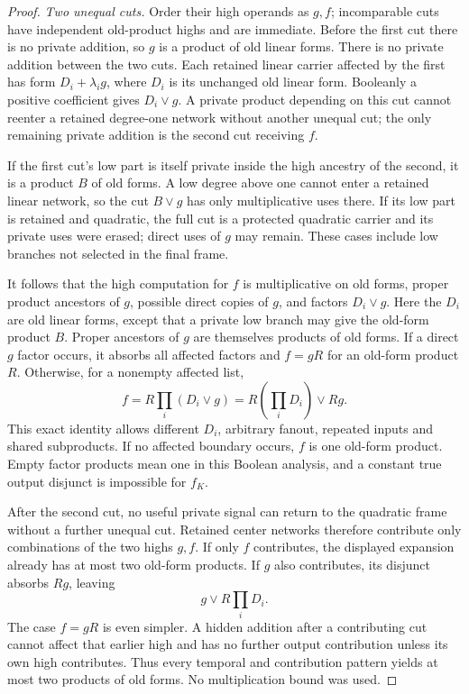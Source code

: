 \documentclass[11pt]{article}
\theoremstyle{definition}
\theoremstyle{remark}
\begin{document}
\begin{proof}
\emph{Two unequal cuts.}
Order their high operands as $g,f$; incomparable cuts have independent old-product highs and are immediate. Before the first cut there is no private addition, so $g$ is a product of old linear forms. There is no private addition between the two cuts. Each retained linear carrier affected by the first has form $D_i+\lambda_i g$, where $D_i$ is its unchanged old linear form. Booleanly a positive coefficient gives $D_i\vee g$. A private product depending on this cut cannot reenter a retained degree-one network without another unequal cut; the only remaining private addition is the second cut receiving $f$.

If the first cut's low part is itself private inside the high ancestry of the second, it is a product $B$ of old forms. A low degree above one cannot enter a retained linear network, so the cut $B\vee g$ has only multiplicative uses there. If its low part is retained and quadratic, the full cut is a protected quadratic carrier and its private uses were erased; direct uses of $g$ may remain. These cases include low branches not selected in the final frame.

It follows that the high computation for $f$ is multiplicative on old forms, proper product ancestors of $g$, possible direct copies of $g$, and factors $D_i\vee g$. Here the $D_i$ are old linear forms, except that a private low branch may give the old-form product $B$. Proper ancestors of $g$ are themselves products of old forms. If a direct $g$ factor occurs, it absorbs all affected factors and $f=gR$ for an old-form product $R$. Otherwise, for a nonempty affected list,
\[
 f=R\prod_i(D_i\vee g)
   =R\left(\prod_iD_i\right)\vee Rg.
\]
This exact identity allows different $D_i$, arbitrary fanout, repeated inputs and shared subproducts. If no affected boundary occurs, $f$ is one old-form product. Empty factor products mean one in this Boolean analysis, and a constant true output disjunct is impossible for $f_K$.

After the second cut, no useful private signal can return to the quadratic frame without a further unequal cut. Retained center networks therefore contribute only combinations of the two highs $g,f$. If only $f$ contributes, the displayed expansion already has at most two old-form products. If $g$ also contributes, its disjunct absorbs $Rg$, leaving
\[
 g\vee R\prod_i D_i.
\]
The case $f=gR$ is even simpler. A hidden addition after a contributing cut cannot affect that earlier high and has no further output contribution unless its own high contributes. Thus every temporal and contribution pattern yields at most two products of old forms. No multiplication bound was used.


\end{proof}
\end{document}
